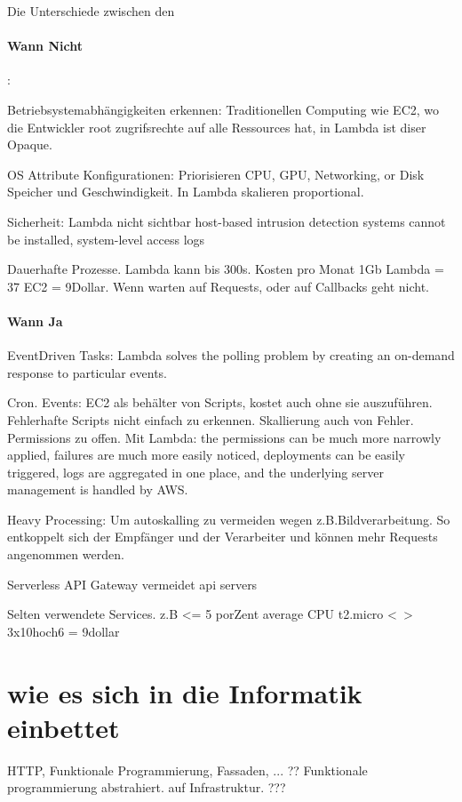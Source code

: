 \documentclass[
12pt,
english,
ngerman,
headsepline,
twoside,
openright,
numbers=noenddot,version=first
]{scrreprt}
\begin{document}
Die Unterschiede zwischen den\cite{lambdaAWS}
\paragraph{Wann Nicht}: 

Betriebsystemabhängigkeiten erkennen: Traditionellen Computing wie EC2, wo die Entwickler root 
zugrifsrechte auf alle Ressources hat, in Lambda ist diser Opaque.

OS Attribute Konfigurationen: Priorisieren CPU, GPU, Networking, or Disk Speicher und Geschwindigkeit. In Lambda skalieren proportional.

Sicherheit: Lambda nicht sichtbar host-based intrusion detection systems cannot be installed, system-level access logs

Dauerhafte Prozesse. Lambda kann bis 300s. Kosten pro Monat 1Gb  Lambda = 37 EC2 = 9Dollar. Wenn warten auf Requests, oder auf Callbacks geht nicht.

\paragraph{Wann Ja}

EventDriven Tasks: Lambda solves the polling problem by creating an on-demand response to particular events.

Cron. Events: EC2 als behälter von Scripts, kostet auch ohne sie auszuführen. Fehlerhafte Scripts nicht einfach zu erkennen. Skallierung auch von Fehler. Permissions zu offen.
Mit Lambda: the permissions can be much more narrowly applied, failures are much more easily noticed, deployments can be easily triggered, logs are aggregated in one place, and the underlying server management is handled by AWS.

Heavy Processing: Um autoskalling zu vermeiden wegen z.B.Bildverarbeitung. So entkoppelt sich der Empfänger und der Verarbeiter und können mehr Requests angenommen werden. 

Serverless API Gateway vermeidet api servers

Selten verwendete Services. z.B <= 5 porZent average CPU t2.micro <~> 3x10hoch6 = 9dollar

\section{wie es sich in die Informatik einbettet}
HTTP, Funktionale Programmierung, Fassaden, ... ?? 
Funktionale programmierung abstrahiert. auf Infrastruktur. ??? 
\end{document}
